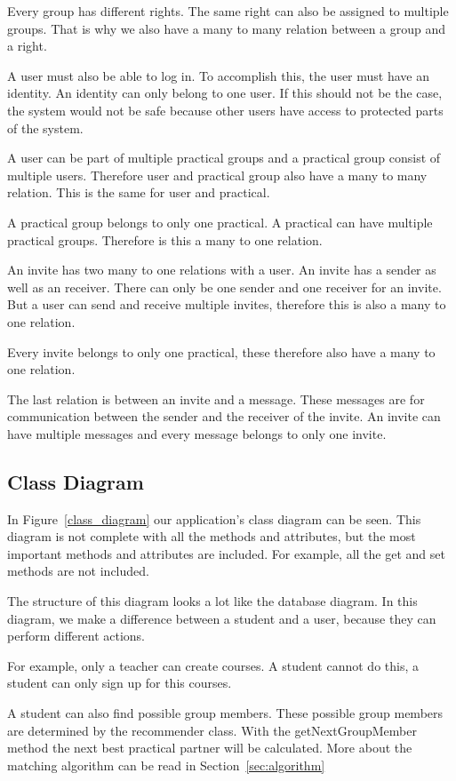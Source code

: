 Every group has different rights.
The same right can also be assigned to multiple groups.
That is why we also have a many to many relation between a group and a right.

A user must also be able to log in.
To accomplish this, the user must have an identity.
An identity can only belong to one user.
If this should not be the case, the system would not be safe because other users have access to protected parts of the system.

A user can be part of multiple practical groups and a practical group consist of multiple users.
Therefore user and practical group also have a many to many relation.
This is the same for user and practical.

A practical group belongs to only one practical.
A practical can have multiple practical groups.
Therefore is this a many to one relation.

An invite has two many to one relations with a user.
An invite has a sender as well as an receiver.
There can only be one sender and one receiver for an invite.
But a user can send and receive multiple invites, therefore this is also a many to one relation.

Every invite belongs to only one practical, these therefore also have a many to one relation.

The last relation is between an invite and a message.
These messages are for communication between the sender and the receiver of the invite.
An invite can have multiple messages and every message belongs to only one invite.

\subsection{Class Diagram}
In Figure~\ref{class_diagram} our application's class diagram can be seen.
This diagram is not complete with all the methods and attributes, but the most important methods and attributes are included.
For example, all the get and set methods are not included.

The structure of this diagram looks a lot like the database diagram.
In this diagram, we make a difference between a student and a user, because they can perform different actions.

For example, only a teacher can create courses.
A student cannot do this, a student can only sign up for this courses.

A student can also find possible group members.
These possible group members are determined by the recommender class.
With the getNextGroupMember method the next best practical partner will be calculated.
More about the matching algorithm can be read in Section~\ref{sec:algorithm}

